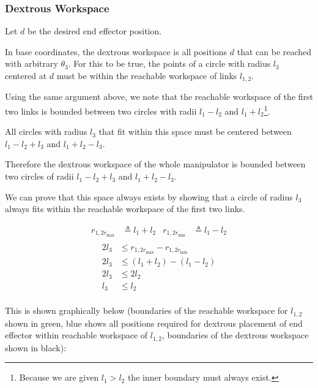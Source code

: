 \documentclass[11pt]{article}
\begin{document}
\subsubsection{Dextrous Workspace}
\label{sec:orgddaf2b2}
Let \(d\) be the desired end effector position.

In base coordinates, the dextrous workspace is all positions \(d\) that can be reached with arbitrary \(\theta_3\).
For this to be true, the points of a circle with radius \(l_3\) centered at \(d\) must be within the reachable workspace of links \(l_{1,2}\).

Using the same argument above, we note that the reachable workspace of the first two links is bounded between two circles with radii \(l_1 - l_2\) and \(l_1 + l_2\)\footnote{Because we are given \(l_1 > l_2\) the inner boundary must always exist.}.

All circles with radius \(l_3\) that fit within this space must be centered between \(l_1 - l_2 + l_3\) and \(l_1 + l_2 - l_3\).

Therefore the dextrous workspace of the whole manipulator is bounded between two circles of radii \(l_1 - l_2 + l_3\) and \(l_1 + l_2 - l_3\).

We can prove that this space always exists by showing that a circle of radius \(l_3\) always fits within the reachable workspace of the first two links.

\begin{align*}
r_{1,2r_\text{max}} &\triangleq l_1 + l_2 &
r_{1,2r_\text{min}} &\triangleq l_1 - l_2 \\
\end{align*}
\begin{align*}
2l_3
&\le
r_{1,2r_\text{max}}
-r_{1,2r_\text{min}} \\
2l_3
&\le
(l_1 + l_2)
-(l_1 - l_2) \\
2l_3 &\le 2l_2 \\
l_3 &\le l_2 \\
\end{align*}

This is shown graphically below
(boundaries of the reachable workspace for \(l_{1,2}\) shown in green, blue shows all positions required for dextrous placement of end effector within reachable workspace of \(l_{1,2}\), boundaries of the dextrous workspace shown in black):
\end{document}

